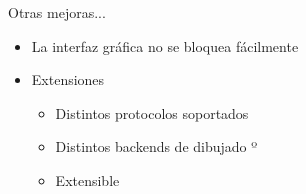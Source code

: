 \documentclass{beamer}
\begin{document}
\begin{frame}{Otras mejoras...}
    \begin{itemize}
        \item La interfaz gráfica no se bloquea fácilmente
        \item Extensiones
        \begin{itemize}
            \item Distintos protocolos soportados
            \item Distintos backends de dibujado
º           \item Extensible
        \end{itemize}
    \end{itemize}
\end{frame}

\end{document}
